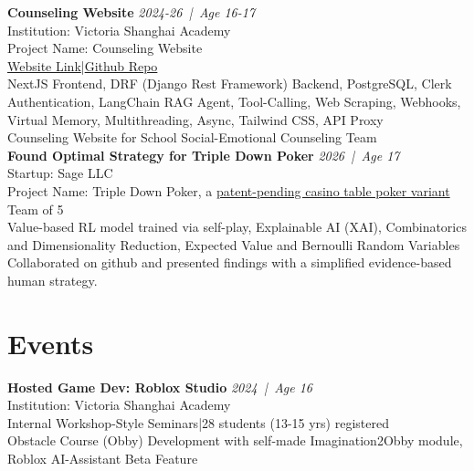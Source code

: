 \documentclass[a4paper,9pt]{extarticle}
\newcommand{\entryheader}[3]{%
    \noindent\textbf{#1} \hfill \textit{#2 \,|\, Age #3}
}
\begin{document}
    \noindent
    \entryheader{Counseling Website}{2024-26}{16-17} \\
    Institution: Victoria Shanghai Academy \\
    Project Name: Counseling Website \\
    \href{https://counseling-website.vercel.app/}{Website Link}|\href{https://github.com/godCoderXYZ/counseling_website}{Github Repo} \\
    NextJS Frontend, DRF (Django Rest Framework) Backend, PostgreSQL, Clerk Authentication, LangChain RAG Agent, Tool-Calling, Web Scraping, Webhooks, Virtual Memory, Multithreading, Async, Tailwind CSS, API Proxy \\
    Counseling Website for School Social-Emotional Counseling Team \\

    \noindent
    \entryheader{Found Optimal Strategy for Triple Down Poker}{2026}{17} \\
    Startup: Sage LLC \\
    Project Name: Triple Down Poker, a \href{https://tripledown.poker/}{patent-pending casino table poker variant}\\
    Team of 5 \\
    Value-based RL model trained via self-play, Explainable AI (XAI), Combinatorics and Dimensionality Reduction, Expected Value and Bernoulli Random Variables\\
    Collaborated on github and presented findings with a simplified evidence-based human strategy.


\section*{Events}
    \noindent
    \entryheader{Hosted Game Dev: Roblox Studio}{2024}{16} \\
    Institution: Victoria Shanghai Academy \\
    Internal Workshop-Style Seminars|28 students (13-15 yrs) registered \\
    Obstacle Course (Obby) Development with self-made Imagination2Obby module, Roblox AI-Assistant Beta Feature \\
\end{document}
